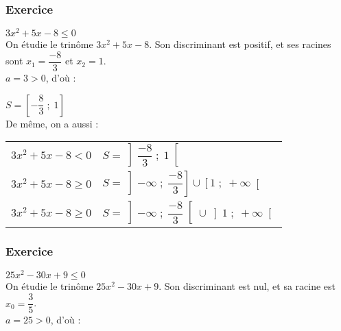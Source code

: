 \subsubsection{Exercice }

$3x^2 + 5x - 8 \leqslant 0$ \\

On étudie le trinôme $3x^2 + 5x - 8$. Son discriminant est positif, et ses racines sont $x_1 = \dfrac{-8}{3}$ et $x_2 = 1$. \\

$a = 3 > 0$, d'où : \\


\vspace*{.3cm}

$S = \left[-\dfrac{8}{3} \; ; \; 1 \right]$ \\

De même, on a aussi : \\

\begin{tabular}{ll}
$3x^2 + 5x - 8 < 0$ & $S = \left]\dfrac{-8}{3} \; ; \; 1\right[$ \\
$3x^2 + 5x - 8 \geqslant 0$ & $S = \left]-\infty \; ; \; \dfrac{-8}{3} \right] \cup \left[1 \; ; \; + \infty \right[$ \\
$3x^2 + 5x - 8 \geqslant 0$ & $S = \left]-\infty \; ; \; \dfrac{-8}{3} \right[ \cup \left]1 \; ; \; + \infty \right[$ \\
\end{tabular}

\subsubsection{Exercice }

$25x^2 -30x +9 \leqslant 0$ \\

On étudie le trinôme $25x^2 -30x +9$. Son discriminant est nul, et sa racine est $x_0 = \dfrac{3}{5}$. \\

$a = 25 > 0$, d'où : \\


